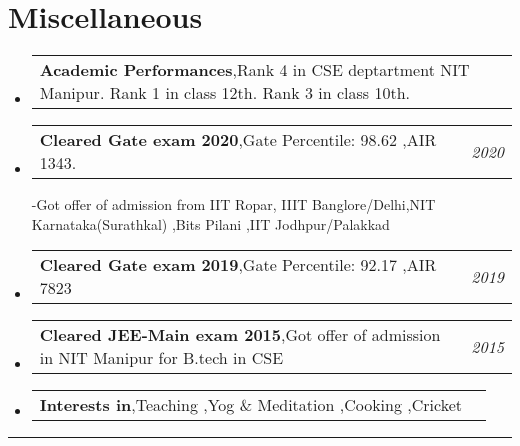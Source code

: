 \documentclass[a4paper,11pt]{article}
\makeatletter
\newcommand{\resumePOR}[3]{
\vspace{0.5mm}\item
    \begin{tabular*}{0.97\textwidth}[t]{l@{\extracolsep{\fill}}r}
        \textbf{#1},\hspace{0.3mm}#2 & \textit{\small{#3}} 
    \end{tabular*}
    \vspace{-2mm}
}
\newcommand{\resumeSubHeadingListStart}{\begin{itemize}[leftmargin=*,labelsep=0mm]}
\newcommand{\resumeSubHeadingListEnd}{\end{itemize}\vspace{2mm}}
\makeatother
\begin{document}
\section{\color{blue}\textbf{Miscellaneous}}
\vspace{-0.1mm}
\resumeSubHeadingListStart
\resumePOR{Academic Performances} %
    {Rank 4 in CSE deptartment NIT Manipur. Rank 1 in class 12th. Rank 3 in class 10th.} %
    {} %
\resumePOR{Cleared Gate exam 2020} %
    {Gate Percentile: 98.62 ,AIR 1343.} %
    {2020} %
    -Got offer of admission from IIT Ropar, IIIT Banglore/Delhi,NIT Karnataka(Surathkal) ,Bits Pilani ,IIT Jodhpur/Palakkad
\vspace{-0.1mm}
\resumePOR{Cleared Gate exam 2019} %
    {Gate Percentile: 92.17 ,AIR 7823} %
    {2019} %
\resumePOR{Cleared JEE-Main exam 2015} %
    {Got offer of admission in NIT Manipur for B.tech in CSE} %
    {2015} %
\resumePOR{Interests in} %
    {Teaching ,Yog \& Meditation ,Cooking ,Cricket } %
    {} %

    
\vspace{-1.2mm}
\resumeSubHeadingListEnd
\hspace*{-5mm}\rule{1.035\textwidth}{0.1mm}


\end{document}

